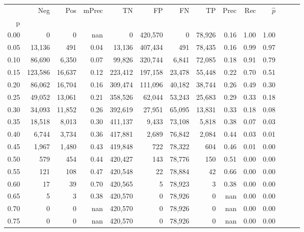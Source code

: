 \begin{tabular}{rrrrrrrrrrrrrr}
\toprule
{} &      Neg &     Pos & mPrec &       TN &       FP &      FN &      TP &  Prec &   Rec & $\hat{p}$ \\
p    &          &         &       &          &          &         &         &       &       &           \\
\midrule
0.00 &        0 &       0 &   nan &        0 &  420,570 &       0 &  78,926 &  0.16 &  1.00 &      1.00 \\
0.05 &   13,136 &     491 &  0.04 &   13,136 &  407,434 &     491 &  78,435 &  0.16 &  0.99 &      0.97 \\
0.10 &   86,690 &   6,350 &  0.07 &   99,826 &  320,744 &   6,841 &  72,085 &  0.18 &  0.91 &      0.79 \\
0.15 &  123,586 &  16,637 &  0.12 &  223,412 &  197,158 &  23,478 &  55,448 &  0.22 &  0.70 &      0.51 \\
0.20 &   86,062 &  16,704 &  0.16 &  309,474 &  111,096 &  40,182 &  38,744 &  0.26 &  0.49 &      0.30 \\
0.25 &   49,052 &  13,061 &  0.21 &  358,526 &   62,044 &  53,243 &  25,683 &  0.29 &  0.33 &      0.18 \\
0.30 &   34,093 &  11,852 &  0.26 &  392,619 &   27,951 &  65,095 &  13,831 &  0.33 &  0.18 &      0.08 \\
0.35 &   18,518 &   8,013 &  0.30 &  411,137 &    9,433 &  73,108 &   5,818 &  0.38 &  0.07 &      0.03 \\
0.40 &    6,744 &   3,734 &  0.36 &  417,881 &    2,689 &  76,842 &   2,084 &  0.44 &  0.03 &      0.01 \\
0.45 &    1,967 &   1,480 &  0.43 &  419,848 &      722 &  78,322 &     604 &  0.46 &  0.01 &      0.00 \\
0.50 &      579 &     454 &  0.44 &  420,427 &      143 &  78,776 &     150 &  0.51 &  0.00 &      0.00 \\
0.55 &      121 &     108 &  0.47 &  420,548 &       22 &  78,884 &      42 &  0.66 &  0.00 &      0.00 \\
0.60 &       17 &      39 &  0.70 &  420,565 &        5 &  78,923 &       3 &  0.38 &  0.00 &      0.00 \\
0.65 &        5 &       3 &  0.38 &  420,570 &        0 &  78,926 &       0 &   nan &  0.00 &      0.00 \\
0.70 &        0 &       0 &   nan &  420,570 &        0 &  78,926 &       0 &   nan &  0.00 &      0.00 \\
0.75 &        0 &       0 &   nan &  420,570 &        0 &  78,926 &       0 &   nan &  0.00 &      0.00 \\

\end{tabular}
